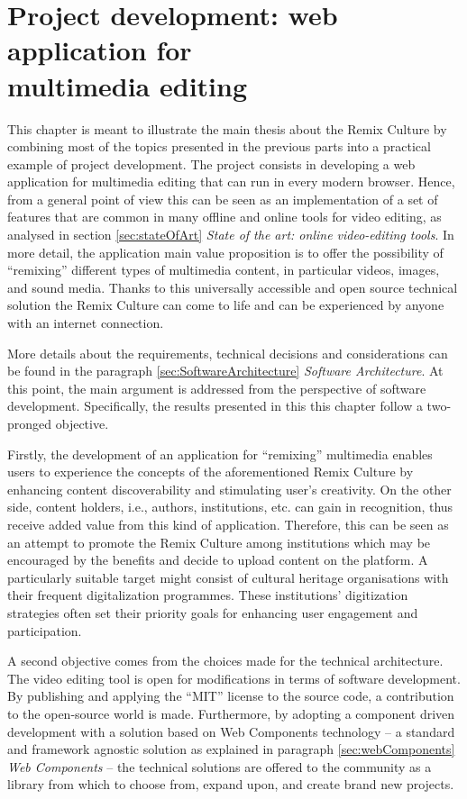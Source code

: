 \chapter{Project development: web application for \\ multimedia editing}
\label{ch:ch3_ProjectDevelopment}


This chapter is meant to illustrate the main thesis about the Remix Culture by combining most of the topics presented in the previous parts into a practical example of project development. The project consists in developing a web application for multimedia editing that can run in every modern browser. Hence, from a general point of view this can be seen as an implementation of a set of features that are common in many offline and online tools for video editing, as analysed in section \ref{sec:stateOfArt} \emph{State of the art: online video-editing tools}. In more detail, the application main value proposition is to offer the possibility of “remixing” different types of multimedia content, in particular videos, images, and sound media. Thanks to this universally accessible and open source technical solution the Remix Culture can come to life and can be experienced by anyone with an internet connection.

More details about the requirements, technical decisions and considerations can be found in the paragraph \ref{sec:SoftwareArchitecture} \emph{Software Architecture}. At this point, the main argument is addressed from the perspective of software development. Specifically, the results presented in this this chapter follow a two-pronged objective.

Firstly, the development of an application for “remixing” multimedia enables users to experience the concepts of the aforementioned Remix Culture by enhancing content discoverability and stimulating user’s creativity. On the other side, content holders, i.e., authors, institutions, etc. can gain in recognition, thus receive added value from this kind of application. Therefore, this can be seen as an attempt to promote the Remix Culture among institutions which may be encouraged by the benefits and decide to upload content on the platform. A particularly suitable target might consist of cultural heritage organisations with their frequent digitalization programmes. These institutions’ digitization strategies often set their priority goals for enhancing user engagement and participation.

A second objective comes from the choices made for the technical architecture. The video editing tool is open for modifications in terms of software development. By publishing and applying the “MIT” license to the source code, a contribution to the open-source world is made. Furthermore, by adopting a component driven development with a solution based on Web Components technology – a standard and framework agnostic solution as explained in paragraph \ref{sec:webComponents} \emph{Web Components} – the technical solutions are offered to the community as a library from which to choose from, expand upon, and create brand new projects.

